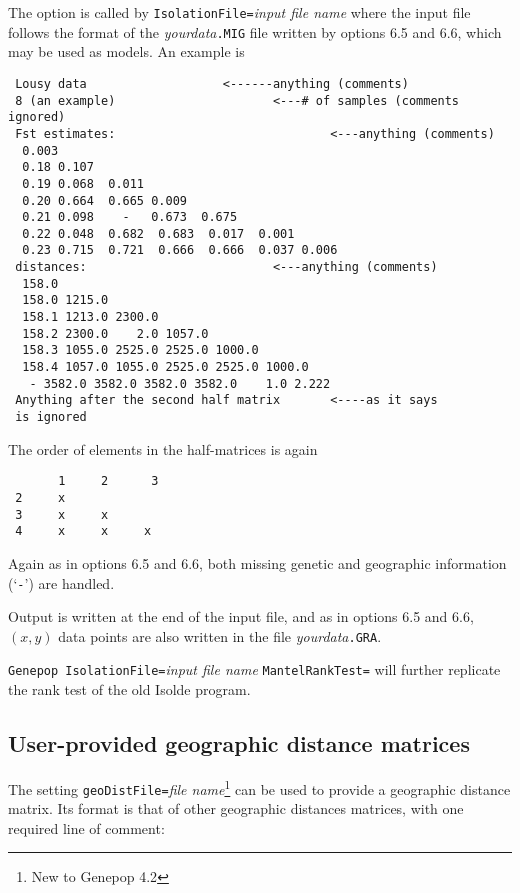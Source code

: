 \documentclass[12pt,]{book}
\let\rmarkdownfootnote\footnote%
\def\footnote{\protect\rmarkdownfootnote}
\theoremstyle{definition}
\theoremstyle{definition}
\theoremstyle{definition}
\theoremstyle{remark}
\begin{document}
The option is called by \texttt{IsolationFile=}\emph{input file name}
where the input file follows the
format of the
\emph{yourdata}\texttt{.MIG} file written by options 6.5 and 6.6, which
may be used as models. An example is

\begin{verbatim}
 Lousy data                   <------anything (comments)
 8 (an example)                      <---# of samples (comments ignored)
 Fst estimates:                              <---anything (comments)
  0.003
  0.18 0.107
  0.19 0.068  0.011
  0.20 0.664  0.665 0.009
  0.21 0.098    -   0.673  0.675
  0.22 0.048  0.682  0.683  0.017  0.001
  0.23 0.715  0.721  0.666  0.666  0.037 0.006
 distances:                          <---anything (comments)
  158.0
  158.0 1215.0
  158.1 1213.0 2300.0
  158.2 2300.0    2.0 1057.0
  158.3 1055.0 2525.0 2525.0 1000.0
  158.4 1057.0 1055.0 2525.0 2525.0 1000.0
   - 3582.0 3582.0 3582.0 3582.0    1.0 2.222
 Anything after the second half matrix       <----as it says
 is ignored
\end{verbatim}

The order of elements in the half-matrices is again

\begin{verbatim}
       1     2      3
 2     x
 3     x     x
 4     x     x     x
\end{verbatim}

Again as in options 6.5 and 6.6, both missing genetic and geographic
information (`\texttt{-}') are handled.

Output is written at the end of the input file, and as in options 6.5
and 6.6, \((x,y)\) data points are also written in the file
\emph{yourdata}\texttt{.GRA}.

\texttt{Genepop\ IsolationFile=}\emph{input file name}
\texttt{MantelRankTest=} will further replicate the rank test of the old
Isolde program.

\subsection{User-provided geographic distance
matrices}\label{user-provided-geographic-distance-matrices}

The setting \texttt{geoDistFile=}\emph{file
name}\footnote{New to Genepop 4.2} can be
used to provide a geographic distance matrix. Its format is that of
other geographic distances matrices, with one required line of comment:
\end{document}
